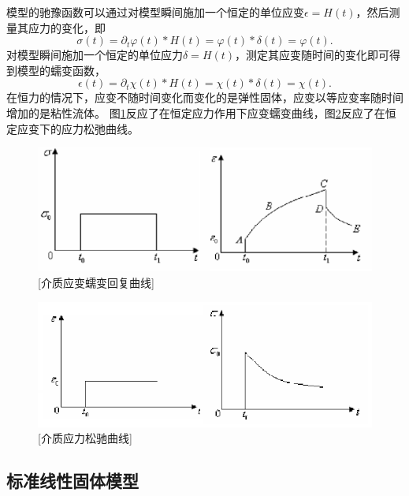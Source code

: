模型的驰豫函数可以通过对模型瞬间施加一个恒定的单位应变$\epsilon=H(t)$，然后测量其应力的变化，即
\begin{equation}
	\sigma(t)=\partial_t\varphi(t)*H(t)=\varphi(t)*\delta(t)=\varphi(t).
\end{equation}
对模型瞬间施加一个恒定的单位应力$\delta=H(t)$，测定其应变随时间的变化即可得到模型的蠕变函数，
\begin{equation}
	\epsilon(t)=\partial_t\chi(t)*H(t)=\chi(t)*\delta(t)=\chi(t).
\end{equation}
在恒力的情况下，应变不随时间变化而变化的是弹性固体，应变以等应变率随时间增加的是粘性流体。
图\ref{fig:strain}反应了在恒定应力作用下应变蠕变曲线，图\ref{fig:stress}反应了在恒定应变下的应力松弛曲线。
\begin{figure}[!htbp]
	    \centering
		\includegraphics[width=0.9\linewidth]{figure/strain}
	    [介质应变蠕变回复曲线]
		\label{fig:strain}
\end{figure}
\begin{figure}[!htbp]
	    \centering
		\includegraphics[width=0.95\linewidth]{figure/stress}
	    [介质应力松驰曲线]
		\label{fig:stress}
\end{figure}

\subsection{标准线性固体模型}

